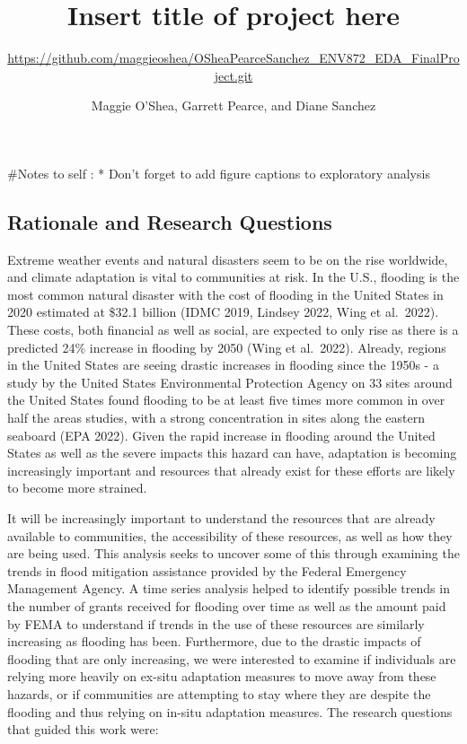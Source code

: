 \documentclass[
  12pt,
]{article}
\title{Insert title of project here}
\subtitle{\url{https://github.com/maggieoshea/OSheaPearceSanchez_ENV872_EDA_FinalProject.git}}
\author{Maggie O'Shea, Garrett Pearce, and Diane Sanchez}
\date{}
\begin{document}
\maketitle

\#Notes to self : * Don't forget to add figure captions to exploratory
analysis

\newpage
\tableofcontents 
\newpage
\listoftables 
\newpage
\listoffigures 
\newpage

\hypertarget{rationale-and-research-questions}{%
\subsection{Rationale and Research
Questions}\label{rationale-and-research-questions}}

Extreme weather events and natural disasters seem to be on the rise
worldwide, and climate adaptation is vital to communities at risk. In
the U.S., flooding is the most common natural disaster with the cost of
flooding in the United States in 2020 estimated at \$32.1 billion (IDMC
2019, Lindsey 2022, Wing et al.~2022). These costs, both financial as
well as social, are expected to only rise as there is a predicted 24\%
increase in flooding by 2050 (Wing et al.~2022). Already, regions in the
United States are seeing drastic increases in flooding since the 1950s -
a study by the United States Environmental Protection Agency on 33 sites
around the United States found flooding to be at least five times more
common in over half the areas studies, with a strong concentration in
sites along the eastern seaboard (EPA 2022). Given the rapid increase in
flooding around the United States as well as the severe impacts this
hazard can have, adaptation is becoming increasingly important and
resources that already exist for these efforts are likely to become more
strained.

It will be increasingly important to understand the resources that are
already available to communities, the accessibility of these resources,
as well as how they are being used. This analysis seeks to uncover some
of this through examining the trends in flood mitigation assistance
provided by the Federal Emergency Management Agency. A time series
analysis helped to identify possible trends in the number of grants
received for flooding over time as well as the amount paid by FEMA to
understand if trends in the use of these resources are similarly
increasing as flooding has been. Furthermore, due to the drastic impacts
of flooding that are only increasing, we were interested to examine if
individuals are relying more heavily on ex-situ adaptation measures to
move away from these hazards, or if communities are attempting to stay
where they are despite the flooding and thus relying on in-situ
adaptation measures. The research questions that guided this work were:
\end{document}
